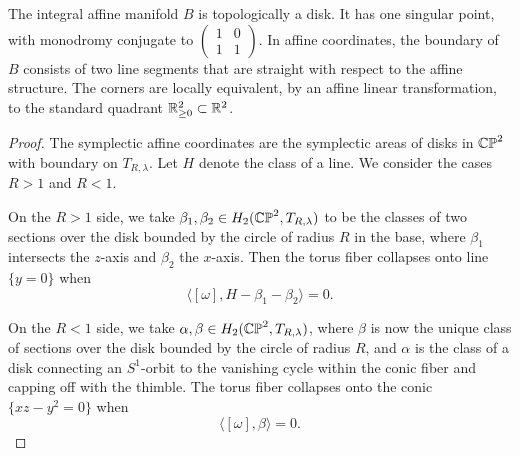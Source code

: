 \documentclass[12pt]{amsart}
\begin{document}
\begin{proposition}
  The integral affine manifold $B$ is topologically a disk. It has one
  singular point, with monodromy conjugate to
  $\begin{pmatrix}1&0\\1&1\end{pmatrix}$. In affine coordinates, the
  boundary of $B$ consists of two line segments that are straight with
  respect to the affine structure. The corners are locally equivalent, by an affine linear transformation, to the standard quadrant $\mathbb{R}_{\geq 0}^2 \subset \mathbb{R}^2$.
\end{proposition}

\begin{proof}
 The symplectic affine coordinates are the
  symplectic areas of disks in $\mathbb{CP}^2$ with boundary on
  $T_{R,\lambda}$. Let $H$ denote the class of a line. We consider the cases $R > 1$ and $R < 1$. 

  On the $R > 1$ side, we take $\beta_1,\beta_2 \in
  H_2(\mathbb{CP}^2,T_{R,\lambda})$ to be the classes of two sections over the
  disk bounded by the circle of radius $R$ in the base, where
  $\beta_1$ intersects the $z$-axis and $\beta_2$ the $x$-axis. Then
  the torus fiber collapses onto line $\{y=0\}$ when
  \begin{equation}
    \langle [\omega], H-\beta_1-\beta_2 \rangle = 0.
  \end{equation}

  On the $R < 1$ side, we take $\alpha, \beta \in
  H_2(\mathbb{CP}^2,T_{R,\lambda})$, where $\beta$ is now the unique class of
  sections over the disk bounded by the circle of radius $R$, and
  $\alpha$ is the class of a disk connecting an $S^1$-orbit to the
  vanishing cycle within the conic fiber and capping off with the
  thimble. The torus fiber collapses onto the conic $\{xz-y^2 = 0\}$
  when
  \begin{equation}
    \langle [\omega], \beta \rangle = 0.
  \end{equation}


\end{proof}
\end{document}
